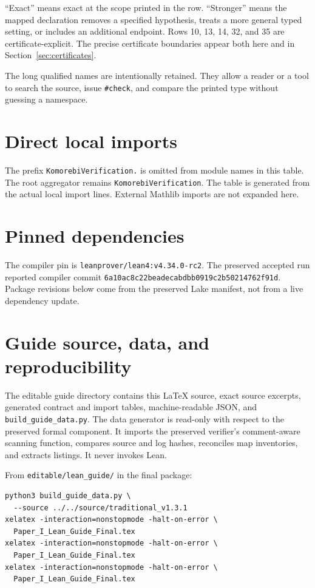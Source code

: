 \documentclass[11pt,a4paper]{article}
\newcommand{\code}[1]{\nolinkurl{#1}}
\begin{document}
``Exact'' means exact at the scope printed in the row. ``Stronger'' means the mapped declaration removes a specified hypothesis, treats a more general typed setting, or includes an additional endpoint. Rows 10, 13, 14, 32, and 35 are certificate-explicit. The precise certificate boundaries appear both here and in Section~\ref{sec:certificates}.

The long qualified names are intentionally retained. They allow a reader or a tool to search the source, issue \texttt{\#check}, and compare the printed type without guessing a namespace.


\clearpage
\appendix
\section{Direct local imports}\label{app:imports}
The prefix \code{KomorebiVerification.} is omitted from module names in this table. The root aggregator remains \code{KomorebiVerification}. The table is generated from the actual local import lines. External Mathlib imports are not expanded here.


\section{Pinned dependencies}\label{app:pins}
The compiler pin is \code{leanprover/lean4:v4.34.0-rc2}. The preserved accepted run reported compiler commit \code{6a10ac8c22beadecabdbb0919c2b50214762f91d}. Package revisions below come from the preserved Lake manifest, not from a live dependency update.


\clearpage
\section{Guide source, data, and reproducibility}

The editable guide directory contains this \LaTeX{} source, exact source excerpts, generated contract and import tables, machine-readable JSON, and \code{build_guide_data.py}. The data generator is read-only with respect to the preserved formal component. It imports the preserved verifier's comment-aware scanning function, compares source and log hashes, reconciles map inventories, and extracts listings. It never invokes Lean.

From \code{editable/lean_guide/} in the final package:
\begin{lstlisting}
python3 build_guide_data.py \
  --source ../../source/traditional_v1.3.1
xelatex -interaction=nonstopmode -halt-on-error \
  Paper_I_Lean_Guide_Final.tex
xelatex -interaction=nonstopmode -halt-on-error \
  Paper_I_Lean_Guide_Final.tex
xelatex -interaction=nonstopmode -halt-on-error \
  Paper_I_Lean_Guide_Final.tex
\end{lstlisting}
\end{document}
